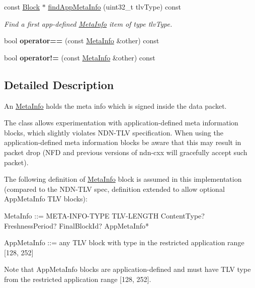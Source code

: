 \begin{DoxyCompactItemize}
const \hyperlink{classndn_1_1Block}{Block} $\ast$ \hyperlink{classndn_1_1MetaInfo_aa2c999c783dd3d0078d495418df5c40e}{find\+App\+Meta\+Info} (uint32\+\_\+t tlv\+Type) const
\begin{DoxyCompactList}\small\item\em Find a first app-\/defined \hyperlink{classndn_1_1MetaInfo}{Meta\+Info} item of type {\ttfamily tlv\+Type}. \end{DoxyCompactList}\item 
bool {\bfseries operator==} (const \hyperlink{classndn_1_1MetaInfo}{Meta\+Info} \&other) const\hypertarget{classndn_1_1MetaInfo_aac1c87fb66feb3def2cd04a9903a8ee3}{}\label{classndn_1_1MetaInfo_aac1c87fb66feb3def2cd04a9903a8ee3}

\item 
bool {\bfseries operator!=} (const \hyperlink{classndn_1_1MetaInfo}{Meta\+Info} \&other) const\hypertarget{classndn_1_1MetaInfo_a1b4ea8eb036a34837e9d7362678a203c}{}\label{classndn_1_1MetaInfo_a1b4ea8eb036a34837e9d7362678a203c}

\end{DoxyCompactItemize}


\subsection{Detailed Description}
An \hyperlink{classndn_1_1MetaInfo}{Meta\+Info} holds the meta info which is signed inside the data packet.

The class allows experimentation with application-\/defined meta information blocks, which slightly violates N\+D\+N-\/\+T\+LV specification. When using the application-\/defined meta information blocks be aware that this may result in packet drop (N\+FD and previous versions of ndn-\/cxx will gracefully accept such packet).

The following definition of \hyperlink{classndn_1_1MetaInfo}{Meta\+Info} block is assumed in this implementation (compared to the N\+D\+N-\/\+T\+LV spec, definition extended to allow optional App\+Meta\+Info T\+LV blocks)\+: \begin{DoxyVerb}MetaInfo ::= META-INFO-TYPE TLV-LENGTH
               ContentType?
               FreshnessPeriod?
               FinalBlockId?
               AppMetaInfo*

AppMetaInfo ::= any TLV block with type in the restricted application range [128, 252]
\end{DoxyVerb}


Note that App\+Meta\+Info blocks are application-\/defined and must have T\+LV type from the restricted application range \mbox{[}128, 252\mbox{]}. 

